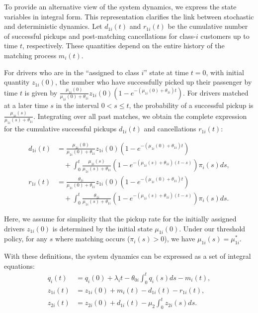 To provide an alternative view of the system dynamics, we express the state variables in integral form.
This representation clarifies the link between stochastic and deterministic dynamics.
Let $d_{1i}(t)$ and $r_{1i}(t)$ be the cumulative number of successful pickups and post-matching cancellations for class-$i$ customers up to time $t$, respectively.
These quantities depend on the entire history of the matching process $m_i(t)$.

For drivers who are in the ``assigned to class $i$'' state at time $t=0$, with initial quantity $z_{1i}(0)$, the number who have successfully picked up their passenger by time $t$ is given by $\frac{\mu_{1i}(0)}{\mu_{1i}(0) + \theta_{1i}} z_{1i}(0)(1 - e^{-(\mu_{1i}(0) + \theta_{1i})t})$.
For drivers matched at a later time $s$ in the interval $0 < s \leq t$, the probability of a successful pickup is $\frac{\mu_{1i}(s)}{\mu_{1i}(s) + \theta_{1i}}$.
Integrating over all past matches, we obtain the complete expression for the cumulative successful pickups $d_{1i}(t)$ and cancellations $r_{1i}(t)$:

\begin{align}
d_{1i}(t) &= \frac{\mu_{1i}(0)}{\mu_{1i}(0) + \theta_{1i}} z_{1i}(0)(1 - e^{-(\mu_{1i}(0) + \theta_{1i})t}) \nonumber \\
&\quad + \int_0^t \frac{\mu_{1i}(s)}{\mu_{1i}(s) + \theta_{1i}}(1 - e^{-(\mu_{1i}(s) + \theta_{1i})(t-s)}) \pi_i(s) ds, \label{eq:integral_di} \\
r_{1i}(t) &= \frac{\theta_{1i}}{\mu_{1i}(0) + \theta_{1i}} z_{1i}(0)(1 - e^{-(\mu_{1i}(0) + \theta_{1i})t}) \nonumber \\
&\quad + \int_0^t \frac{\theta_{1i}}{\mu_{1i}(s) + \theta_{1i}}(1 - e^{-(\mu_{1i}(s) + \theta_{1i})(t-s)}) \pi_i(s) ds. \label{eq:integral_ri}
\end{align}

Here, we assume for simplicity that the pickup rate for the initially assigned drivers $z_{1i}(0)$ is determined by the initial state $\mu_{1i}(0)$.
Under our threshold policy, for any $s$ where matching occurs ($\pi_i(s)>0$), we have $\mu_{1i}(s) = \mu_{1i}^*$.

With these definitions, the system dynamics can be expressed as a set of integral equations:
\begin{align*}
q_i(t) &= q_i(0) + \lambda_i t - \theta_{0i} \int_0^t q_i(s) ds - m_i(t), \\
z_{1i}(t) &= z_{1i}(0) + m_i(t) - d_{1i}(t) - r_{1i}(t), \\
z_{2i}(t) &= z_{2i}(0) + d_{1i}(t) - \mu_2 \int_0^t z_{2i}(s) ds.
\end{align*}

